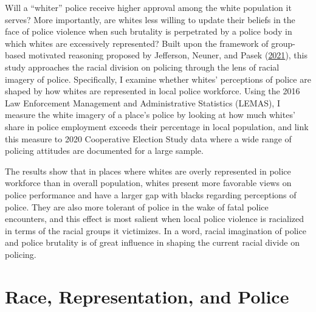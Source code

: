 \documentclass[
  12pt,
]{article}
\begin{document}
Will a ``whiter'' police receive higher approval among the white
population it serves? More importantly, are whites less willing to
update their beliefs in the face of police violence when such brutality
is perpetrated by a police body in which whites are excessively
represented? Built upon the framework of group-based motivated reasoning
proposed by Jefferson, Neuner, and Pasek
(\protect\hyperlink{ref-jefferson2021}{2021}), this study approaches the
racial division on policing through the lens of racial imagery of
police. Specifically, I examine whether whites' perceptions of police
are shaped by how whites are represented in local police workforce.
Using the 2016 Law Enforcement Management and Administrative Statistics
(LEMAS), I measure the white imagery of a place's police by looking at
how much whites' share in police employment exceeds their percentage in
local population, and link this measure to 2020 Cooperative Election
Study data where a wide range of policing attitudes are documented for a
large sample.

The results show that in places where whites are overly represented in
police workforce than in overall population, whites present more
favorable views on police performance and have a larger gap with blacks
regarding perceptions of police. They are also more tolerant of police
in the wake of fatal police encounters, and this effect is most salient
when local police violence is racialized in terms of the racial groups
it victimizes. In a word, racial imagination of police and police
brutality is of great influence in shaping the current racial divide on
policing.

\hypertarget{race-representation-and-police}{%
\section{Race, Representation, and
Police}\label{race-representation-and-police}}
\end{document}
